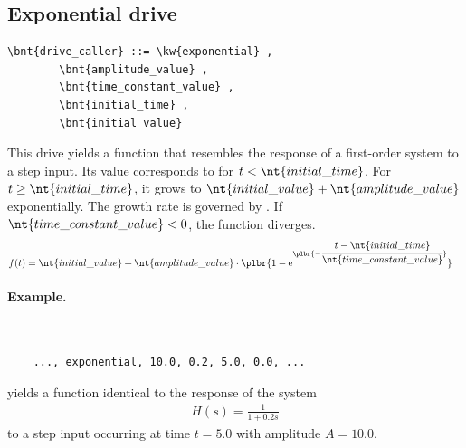 \subsection{Exponential drive}
\begin{Verbatim}[commandchars=\\\{\}]
    \bnt{drive_caller} ::= \kw{exponential} ,
        \bnt{amplitude_value} ,
        \bnt{time_constant_value} ,
        \bnt{initial_time} ,
        \bnt{initial_value}
\end{Verbatim}
This drive yields a function that resembles the response
of a first-order system to a step input.
Its value corresponds to 
for $t < \nt{initial\_time}$.
For $t \ge \nt{initial\_time}$, it grows to
$\nt{initial\_value} + \nt{amplitude\_value}$
exponentially.
The growth rate is governed by .
If $\nt{time\_constant\_value} < 0$, the function diverges.
\begin{align}
	f(t)
	&=
	\nt{initial\_value}
	+ \nt{amplitude\_value} \cdot \plbr{
		1 - \text{e}^{\plbr{-\cfrac{t - \nt{initial\_time}}{\nt{time\_constant\_value}}}}
	}
\end{align}

\paragraph{Example.} \
\begin{verbatim}
    ..., exponential, 10.0, 0.2, 5.0, 0.0, ...
\end{verbatim}
yields a function identical to the response of the system
\begin{align}
	H(s) = \frac{1}{1 + 0.2 s}
\end{align}
to a step input occurring at time $t=5.0$ with amplitude $A=10.0$.

